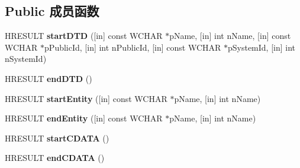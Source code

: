 \subsection*{Public 成员函数}
\begin{DoxyCompactItemize}
\item 
\mbox{\label{interface_m_s_x_m_l2_1_1_i_s_a_x_lexical_handler_a9dc751b2bda45f399fbf6840e72a1248}} 
H\+R\+E\+S\+U\+LT {\bfseries start\+D\+TD} (\mbox{[}in\mbox{]} const W\+C\+H\+AR $\ast$p\+Name, \mbox{[}in\mbox{]} int n\+Name, \mbox{[}in\mbox{]} const W\+C\+H\+AR $\ast$p\+Public\+Id, \mbox{[}in\mbox{]} int n\+Public\+Id, \mbox{[}in\mbox{]} const W\+C\+H\+AR $\ast$p\+System\+Id, \mbox{[}in\mbox{]} int n\+System\+Id)
\item 
\mbox{\label{interface_m_s_x_m_l2_1_1_i_s_a_x_lexical_handler_ae998805090d10f27b3e349a410d7583e}} 
H\+R\+E\+S\+U\+LT {\bfseries end\+D\+TD} ()
\item 
\mbox{\label{interface_m_s_x_m_l2_1_1_i_s_a_x_lexical_handler_abd6b0f77da7917b1f52b494e028bad61}} 
H\+R\+E\+S\+U\+LT {\bfseries start\+Entity} (\mbox{[}in\mbox{]} const W\+C\+H\+AR $\ast$p\+Name, \mbox{[}in\mbox{]} int n\+Name)
\item 
\mbox{\label{interface_m_s_x_m_l2_1_1_i_s_a_x_lexical_handler_a8ea421b901347b2bf441d230f1a62740}} 
H\+R\+E\+S\+U\+LT {\bfseries end\+Entity} (\mbox{[}in\mbox{]} const W\+C\+H\+AR $\ast$p\+Name, \mbox{[}in\mbox{]} int n\+Name)
\item 
\mbox{\label{interface_m_s_x_m_l2_1_1_i_s_a_x_lexical_handler_aad16b9ac4f18c8fe10cdab176202fd45}} 
H\+R\+E\+S\+U\+LT {\bfseries start\+C\+D\+A\+TA} ()
\item 
\mbox{\label{interface_m_s_x_m_l2_1_1_i_s_a_x_lexical_handler_a4bfd40c57cec0cdc15e19724934bfccd}} 
H\+R\+E\+S\+U\+LT {\bfseries end\+C\+D\+A\+TA} ()
\item 
\mbox{\label{interface_m_s_x_m_l2_1_1_i_s_a_x_lexical_handler_a872a71206758098ed46b26aba0550c05}} 

\end{DoxyCompactItemize}

